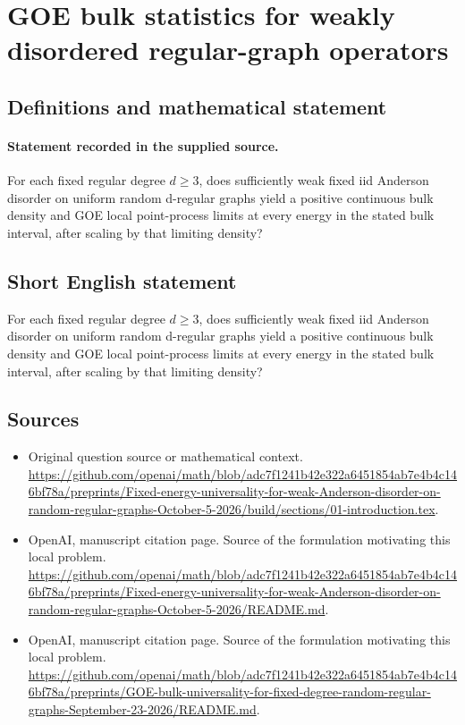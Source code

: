 \documentclass[11pt]{article}
\begin{document}
\section*{GOE bulk statistics for weakly disordered regular-graph operators}\label{30007343}
\subsection{Definitions and mathematical statement}
\paragraph{Statement recorded in the supplied source.}
For each fixed regular degree $d\geq 3$, does sufficiently weak fixed iid Anderson disorder on uniform random d-regular graphs yield a positive continuous bulk density and GOE local point-process limits at every energy in the stated bulk interval, after scaling by that limiting density?
\subsection{Short English statement}
For each fixed regular degree $d\geq 3$, does sufficiently weak fixed iid Anderson disorder on uniform random d-regular graphs yield a positive continuous bulk density and GOE local point-process limits at every energy in the stated bulk interval, after scaling by that limiting density?
\subsection{Sources}
\begin{itemize}
\item[S1] Original question source or mathematical context.
\url{https://github.com/openai/math/blob/adc7f1241b42e322a6451854ab7e4b4c146bf78a/preprints/Fixed-energy-universality-for-weak-Anderson-disorder-on-random-regular-graphs-October-5-2026/build/sections/01-introduction.tex}.
\item[S2] OpenAI, manuscript citation page. Source of the formulation motivating this local problem.
\url{https://github.com/openai/math/blob/adc7f1241b42e322a6451854ab7e4b4c146bf78a/preprints/Fixed-energy-universality-for-weak-Anderson-disorder-on-random-regular-graphs-October-5-2026/README.md}.
\item[S3] OpenAI, manuscript citation page. Source of the formulation motivating this local problem.
\url{https://github.com/openai/math/blob/adc7f1241b42e322a6451854ab7e4b4c146bf78a/preprints/GOE-bulk-universality-for-fixed-degree-random-regular-graphs-September-23-2026/README.md}.
\end{itemize}
\end{document}
